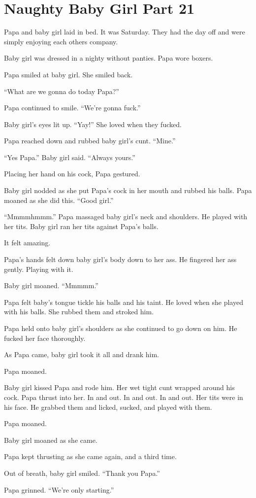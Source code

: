 \section{Naughty Baby Girl Part 21}

     Papa and baby girl laid in bed. It was Saturday. They had the day off and were simply enjoying each others company.

     Baby girl was dressed in a nighty without panties. Papa wore boxers.

     Papa smiled at baby girl. She smiled back.

     “What are we gonna do today Papa?”

     Papa continued to smile. “We’re gonna fuck.”

     Baby girl’s eyes lit up. “Yay!” She loved when they fucked.

     Papa reached down and rubbed baby girl’s cunt. “Mine.”

     “Yes Papa.” Baby girl said. “Always yours.”

     Placing her hand on his cock, Papa gestured.

     Baby girl nodded as she put Papa’s cock in her mouth and rubbed his balls. Papa moaned as she did this. “Good girl.”

     “Mmmmhmmm.” Papa massaged baby girl’s neck and shoulders. He played with her tits. Baby girl ran her tits against Papa’s balls.

     It felt amazing.

     Papa’s hands felt down baby girl’s body down to her ass. He fingered her ass gently. Playing with it.

     Baby girl moaned. “Mmmmm.”

     Papa felt baby’s tongue tickle his balls and his taint. He loved when she played with his balls. She rubbed them and stroked him.

     Papa held onto baby girl’s shoulders as she continued to go down on him. He fucked her face thoroughly.

     As Papa came, baby girl took it all and drank him.

     Papa moaned.

     Baby girl kissed Papa and rode him. Her wet tight cunt wrapped around his cock. Papa thrust into her. In and out. In and out. In and out. Her tits were in his face. He grabbed them and licked, sucked, and played with them.

     Papa moaned.

     Baby girl moaned as she came.

     Papa kept thrusting as she came again, and a third time.

     Out of breath, baby girl smiled. “Thank you Papa.”

     Papa grinned. “We’re only starting.”


